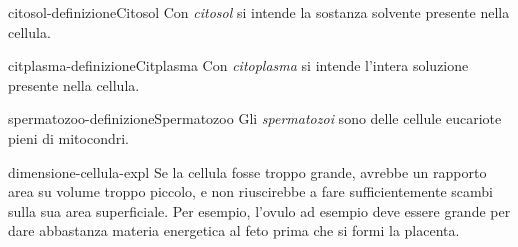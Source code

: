 \documentclass[preview]{standalone}
\begin{document}
\begin{snippetdefinition}{citosol-definizione}{Citosol}
    Con \textit{citosol} si intende la sostanza solvente presente nella cellula.
\end{snippetdefinition}

\begin{snippetdefinition}{citplasma-definizione}{Citplasma}
    Con \textit{citoplasma} si intende l'intera soluzione presente nella cellula.
\end{snippetdefinition}

\begin{snippetdefinition}{spermatozoo-definizione}{Spermatozoo}
    Gli \textit{spermatozoi} sono delle cellule eucariote pieni di mitocondri.
\end{snippetdefinition}

\begin{snippet}{dimensione-cellula-expl}
    Se la cellula fosse troppo grande, avrebbe un rapporto area su volume troppo piccolo, e non riuscirebbe
    a fare sufficientemente scambi sulla sua area superficiale.
    Per esempio, l'ovulo ad esempio deve essere grande per dare
    abbastanza materia energetica al feto prima che si
    formi la placenta.
\end{snippet}
\end{document}
